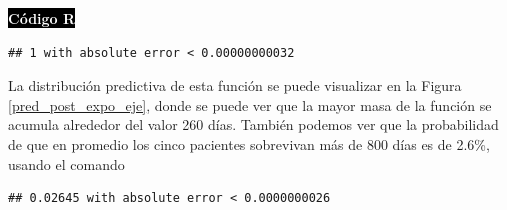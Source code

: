 \begin{Eje}
    \colorbox{black}{\textcolor{white}{\textbf{C\'odigo R}}}
\begin{knitrout}
\color{fgcolor}\begin{kframe}
\begin{alltt}
\hlkwb{<-}\hlstd{(}\hlstd{)\{}
\hlopt{/}\hlopt{+}\hlopt{*}\hlopt{^}\hlopt{*}\hlopt{*}\hlopt{/}\hlopt{+}\hlopt{*}\hlopt{^}\hlopt{/}\hlopt{*}
\hlstd{\}}

\hlkwb{<-}\hlkwb{<-}
\hlkwb{<-}
\hlkwb{<-}
\hlkwb{<-}
\hlstd{,}\hlstd{)}
\end{alltt}
\begin{verbatim}
## 1 with absolute error < 0.00000000032
\end{verbatim}
\end{kframe}
\end{knitrout}
    La distribuci\'on predictiva de esta funci\'on se puede visualizar en la Figura \ref{pred_post_expo_eje}, donde se puede ver que la mayor masa de la funci\'on se acumula alrededor del valor 260 d\'ias. Tambi\'en podemos ver que la probabilidad de que en promedio los cinco pacientes sobrevivan m\'as de 800 d\'ias es de 2.6\%, usando el comando
\begin{knitrout}
\color{fgcolor}\begin{kframe}
\begin{alltt}
\hlstd{,}\hlstd{)}
\end{alltt}
\begin{verbatim}
## 0.02645 with absolute error < 0.0000000026
\end{verbatim}
\end{kframe}
\end{knitrout}
    \end{Eje}
    
